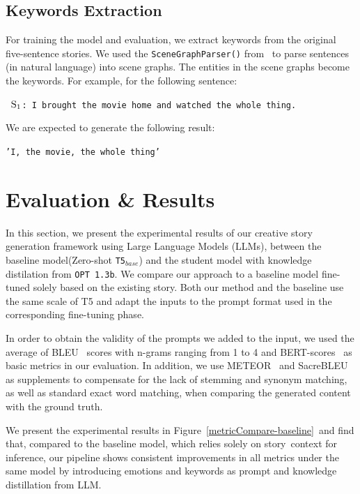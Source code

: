 \documentclass{article} %
\begin{document}
\subsection{Keywords Extraction}
For training the model and evaluation, we extract keywords from the original five-sentence stories. We used the \texttt{SceneGraphParser()} from~\cite{wu2019unified} to parse sentences (in natural language) into scene graphs. The entities in the scene graphs become the keywords. For example, for the following sentence: 
\begin{center}
    \texttt{
    $\textsc{S}_1$: I brought the movie home and watched the whole thing.
    }
\end{center}
We are expected to generate the following result:
\begin{center}
    \texttt{'I, the movie, the whole thing'}
\end{center}

\section{Evaluation \& Results}
In this section, we present the experimental results of our creative story generation framework using Large Language Models (LLMs), between the baseline model(Zero-shot \texttt{T5$_{base}$}) and the student model with knowledge distilation from \texttt{OPT 1.3b}. We compare our approach to a baseline model fine-tuned solely based on the existing story. Both our method and the baseline use the same scale of T5 and adapt the inputs to the prompt format used in the corresponding fine-tuning phase.

In order to obtain the validity of the prompts we added to the input, we used the average of BLEU~\cite{lin-och-2004-orange} scores with n-grams ranging from 1 to 4 and BERT-scores~\cite{https://doi.org/10.48550/arxiv.1904.09675} as basic metrics in our evaluation. In addition, we use METEOR~\cite{banarjee2005} and SacreBLEU\cite{post-2018-call} as supplements to compensate for the lack of stemming and synonym matching, as well as standard exact word matching, when comparing the generated content with the ground truth.

We present the experimental results in Figure~\ref{metricCompare-baseline} and find that, compared to the baseline model, which relies solely on story context for inference, our pipeline shows consistent improvements in all metrics under the same model by introducing emotions and keywords as prompt and knowledge distillation from LLM.
\end{document}
